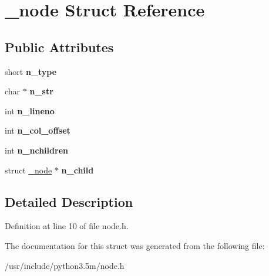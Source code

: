 \hypertarget{struct__node}{}\section{\+\_\+node Struct Reference}
\label{struct__node}
\subsection*{Public Attributes}
\begin{DoxyCompactItemize}
\item 
short {\bfseries n\+\_\+type}\hypertarget{struct__node_a1e33106d8300c321ff2f0f42e66de92d}{}\label{struct__node_a1e33106d8300c321ff2f0f42e66de92d}

\item 
char $\ast$ {\bfseries n\+\_\+str}\hypertarget{struct__node_af35079752ee060258bf77220fba1b166}{}\label{struct__node_af35079752ee060258bf77220fba1b166}

\item 
int {\bfseries n\+\_\+lineno}\hypertarget{struct__node_a0e7e01a2a66d8b94029ed2dcdadb139f}{}\label{struct__node_a0e7e01a2a66d8b94029ed2dcdadb139f}

\item 
int {\bfseries n\+\_\+col\+\_\+offset}\hypertarget{struct__node_a6e2c596f659504275df03b590c25b4bc}{}\label{struct__node_a6e2c596f659504275df03b590c25b4bc}

\item 
int {\bfseries n\+\_\+nchildren}\hypertarget{struct__node_acf53660d344ef4ecfacb77c3658848ea}{}\label{struct__node_acf53660d344ef4ecfacb77c3658848ea}

\item 
struct \hyperlink{struct__node}{\+\_\+node} $\ast$ {\bfseries n\+\_\+child}\hypertarget{struct__node_ad86383d3bc0a5c37e389ee7bd2804752}{}\label{struct__node_ad86383d3bc0a5c37e389ee7bd2804752}

\end{DoxyCompactItemize}


\subsection{Detailed Description}


Definition at line 10 of file node.\+h.



The documentation for this struct was generated from the following file\+:\begin{DoxyCompactItemize}
\item 
/usr/include/python3.\+5m/node.\+h\end{DoxyCompactItemize}
